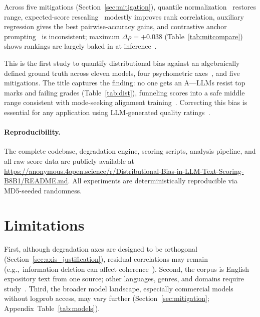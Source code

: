 \documentclass[11pt]{article}
\newcommand{\eg}{e.g.,\ }
\begin{document}
Across five mitigations (Section~\ref{sec:mitigation}), quantile
normalization~\citep{bolstad2003comparison} restores range,
expected-score rescaling~\citep{liu2023geval} modestly improves rank
correlation, auxiliary regression gives the best pairwise-accuracy gains,
and contrastive anchor prompting~\citep{zheng2023judging,liu2023geval}
is inconsistent; maximum $\Delta\rho=+0.038$ (Table~\ref{tab:mitcompare})
shows rankings are largely baked in at inference~\citep{rafailov2023direct}.

This is the first study to quantify distributional bias against an
algebraically defined ground truth across eleven models, four
psychometric axes~\citep{attali2006automated,mcnamara2010linguistic}, and
five mitigations. The title captures the finding: no one gets an A---LLMs
resist top marks and failing grades (Table~\ref{tab:dist}), funneling
scores into a safe middle range consistent with mode-seeking alignment
training~\citep{rafailov2023direct}. Correcting this bias is essential
for any application using LLM-generated quality ratings~\citep{zheng2023judging,liu2023geval}.

\paragraph{Reproducibility.} The complete codebase, degradation engine, scoring scripts, analysis pipeline, and all raw score data are publicly available at \url{https://anonymous.4open.science/r/Distributional-Bias-in-LLM-Text-Scoring-B8B1/README.md}. All experiments are deterministically reproducible via MD5-seeded randomness.

\section*{Limitations}

First, although degradation axes are designed to be orthogonal
(Section~\ref{sec:axis_justification}), residual correlations may remain
(\eg information deletion can affect coherence~\citep{barzilay2008modeling}).
Second, the corpus is English expository text from one source; other
languages, genres, and domains require study~\citep{mcnamara2010linguistic}.
Third, the broader model landscape, especially commercial models without
logprob access, may vary further (Section~\ref{sec:mitigation};
Appendix~Table~\ref{tab:models}).
\end{document}

